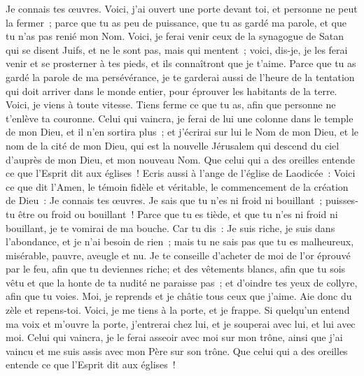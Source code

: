 \begin{multicols}{2}
Je connais tes œuvres. Voici, j'ai ouvert une porte devant toi, et personne ne peut la fermer~; parce que tu as peu de puissance, que tu as gardé ma parole, et que tu n'as pas renié mon Nom.
Voici, je ferai venir ceux de la synagogue de Satan qui se disent Juifs, et ne le sont pas, mais qui mentent~; voici, dis-je, je les ferai venir et se prosterner à tes pieds, et ils connaîtront que je t'aime.
Parce que tu as gardé la parole de ma persévérance, je te garderai aussi de l'heure de la tentation qui doit arriver dans le monde entier, pour éprouver les habitants de la terre.
Voici, je viens à toute vitesse. Tiens ferme ce que tu as, afin que personne ne t'enlève ta couronne.
Celui qui vaincra, je ferai de lui une colonne dans le temple de mon Dieu, et il n'en sortira plus~; et j'écrirai sur lui le Nom de mon Dieu, et le nom de la cité de mon Dieu, qui est la nouvelle Jérusalem qui descend du ciel d'auprès de mon Dieu, et mon nouveau Nom.
Que celui qui a des oreilles entende ce que l'Esprit dit aux églises~!
Ecris aussi à l'ange de l'église de Laodicée~: Voici ce que dit l'Amen, le témoin fidèle et véritable, le commencement de la création de Dieu~:
Je connais tes œuvres. Je sais que tu n'es ni froid ni bouillant~; puisses-tu être ou froid ou bouillant~!
Parce que tu es tiède, et que tu n'es ni froid ni bouillant, je te vomirai de ma bouche.
Car tu dis~: Je suis riche, je suis dans l'abondance, et je n'ai besoin de rien~; mais tu ne sais pas que tu es malheureux, misérable, pauvre, aveugle et nu.
Je te conseille d'acheter de moi de l'or éprouvé par le feu, afin que tu deviennes riche; et des vêtements blancs, afin que tu sois vêtu et que la honte de ta nudité ne paraisse pas~; et d'oindre tes yeux de collyre, afin que tu voies.
Moi, je reprends et je châtie tous ceux que j'aime. Aie donc du zèle et repens-toi.
Voici, je me tiens à la porte, et je frappe. Si quelqu'un entend ma voix et m'ouvre la porte, j'entrerai chez lui, et je souperai avec lui, et lui avec moi.
Celui qui vaincra, je le ferai asseoir avec moi sur mon trône, ainsi que j'ai vaincu et me suis assis avec mon Père sur son trône.
Que celui qui a des oreilles entende ce que l'Esprit dit aux églises~!

\end{multicols}

